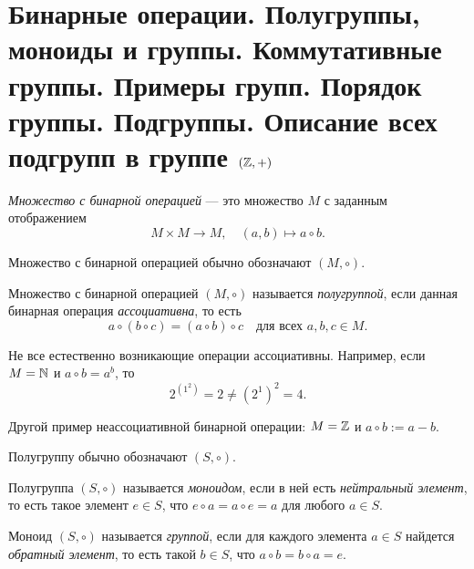 \section{Бинарные операции. Полугруппы, моноиды и группы. Коммутативные группы. Примеры групп. Порядок группы. Подгруппы. Описание всех подгрупп в группе $(\mathbb{Z}, +)$}

\begin{definition}
    \textit{Множество с бинарной операцией} --- это множество $M$ с заданным отображением
    \begin{equation*}
        M \times M \to M, \quad (a, b) \mapsto a \circ b
    .\end{equation*}

    Множество с бинарной операцией обычно обозначают $(M, \circ)$.
\end{definition}

\begin{definition}
    Множество с бинарной операцией $(M, \circ)$ называется \textit{полугруппой}, если данная бинарная операция \textit{ассоциативна}, то есть
    \begin{equation*}
        a \circ (b \circ c) = (a \circ b) \circ c \quad \text{для всех } a, b, c \in M
    .\end{equation*}
\end{definition}

Не все естественно возникающие операции ассоциативны. Например, если $M = \mathbb{N}$ и $a \circ b = a ^{b}$, то
\begin{equation*}
    2^{(1^{2})} = 2 \neq (2^{1})^{2} = 4
.\end{equation*}

Другой пример неассоциативной бинарной операции: $M = \mathbb{Z}$ и $a \circ b := a - b$.

Полугруппу обычно обозначают $(S, \circ)$.

\begin{definition}
    Полугруппа $(S, \circ)$ называется \textit{моноидом}, если в ней есть \textit{нейтральный элемент}, то есть такое элемент $e \in S$, что $e \circ a = a \circ e = a$ для любого $a \in S$.
\end{definition}

\begin{comment}
    Если в полугруппе есть нейтральный элемент, то он один. В самом деле, $e_1 \circ e_2 = e_1 = e_2$.
\end{comment}

\begin{definition}
    Моноид $(S, \circ)$ называется \textit{группой}, если для каждого элемента $a \in S$ найдется \textit{обратный элемент}, то есть такой $b \in S$, что $a \circ b = b \circ a = e$.
\end{definition}

